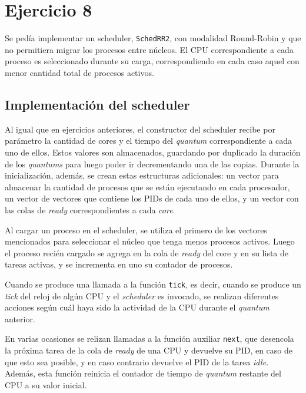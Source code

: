 \section{Ejercicio 8}

Se pedía implementar un scheduler, \texttt{SchedRR2}, con modalidad Round-Robin
y que no permitiera migrar los procesos entre núcleos. El CPU correspondiente a
cada proceso es seleccionado durante su carga, correspondiendo en cada caso
aquel con menor cantidad total de procesos activos.

\subsection{Implementación del scheduler}

Al igual que en ejercicios anteriores, el constructor del scheduler recibe por
parámetro la cantidad de cores y el tiempo del \emph{quantum} correspondiente a
cada uno de ellos. Estos valores son almacenados, guardando por duplicado la
duración de los \emph{quantums} para luego poder ir decrementando una de las
copias. Durante la inicialización, además, se crean estas estructuras
adicionales: un vector para almacenar la cantidad de procesos que se están
ejecutando en cada procesador, un vector de vectores que contiene los PIDs de
cada uno de ellos, y un vector con las colas de \emph{ready} correspondientes a
cada \emph{core}.

Al cargar un proceso en el scheduler, se utiliza el primero de los vectores
mencionados para seleccionar el núcleo que tenga menos procesos activos. Luego
el proceso recién cargado se agrega en la cola de \emph{ready} del core y en su
lista de tareas activas, y se incrementa en uno su contador de procesos.

Cuando se produce una llamada a la función \texttt{tick}, es decir, cuando se
produce un \emph{tick} del reloj de algún CPU y el \emph{scheduler} es invocado,
se realizan diferentes acciones según cuál haya sido la actividad de la CPU
durante el \emph{quantum} anterior.

En varias ocasiones se relizan llamadas a la función auxiliar \texttt{next}, que
desencola la próxima tarea de la cola de \emph{ready} de una CPU y devuelve su
PID, en caso de que esto sea posible, y en caso contrario devuelve el PID de la
tarea \emph{idle}. Además, esta función reinicia el contador de tiempo de
\emph{quantum} restante del CPU a su valor inicial.

